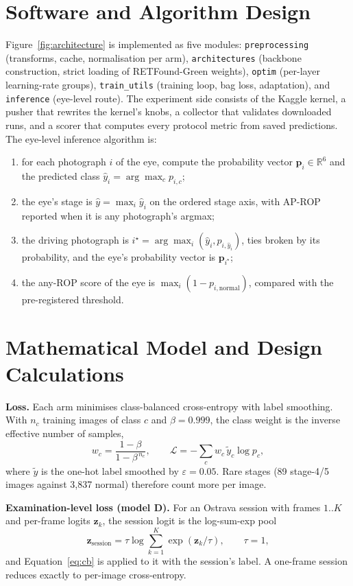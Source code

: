 \section{Software and Algorithm Design}
Figure~\ref{fig:architecture} is implemented as five modules: \texttt{preprocessing} (transforms, cache, normalisation per arm), \texttt{architectures} (backbone construction, strict loading of RETFound-Green weights), \texttt{optim} (per-layer learning-rate groups), \texttt{train\_utils} (training loop, bag loss, adaptation), and \texttt{inference} (eye-level route). The experiment side consists of the Kaggle kernel, a pusher that rewrites the kernel's knobs, a collector that validates downloaded runs, and a scorer that computes every protocol metric from saved predictions. The eye-level inference algorithm is:
\begin{enumerate}
\item for each photograph $i$ of the eye, compute the probability vector $\mathbf{p}_i\in\mathbb{R}^6$ and the predicted class $\hat{y}_i=\arg\max_c p_{i,c}$;
\item the eye's stage is $\hat{y}=\max_i \hat{y}_i$ on the ordered stage axis, with AP-ROP reported when it is any photograph's argmax;
\item the driving photograph is $i^\star=\arg\max_i(\hat{y}_i, p_{i,\hat{y}_i})$, ties broken by its probability, and the eye's probability vector is $\mathbf{p}_{i^\star}$;
\item the any-ROP score of the eye is $\max_i(1-p_{i,\text{normal}})$, compared with the pre-registered threshold.
\end{enumerate}

\section{Mathematical Model and Design Calculations}
\textbf{Loss.} Each arm minimises class-balanced cross-entropy with label smoothing. With $n_c$ training images of class $c$ and $\beta=0.999$, the class weight is the inverse effective number of samples,
\begin{equation}\label{eq:cb}
w_c=\frac{1-\beta}{1-\beta^{\,n_c}},\qquad
\mathcal{L}=-\sum_{c}w_c\,\tilde{y}_c\log p_c,
\end{equation}
where $\tilde{y}$ is the one-hot label smoothed by $\varepsilon=0.05$. Rare stages (89 stage-4/5 images against 3{,}837 normal) therefore count more per image.

\textbf{Examination-level loss (model D).} For an Ostrava session with frames $1..K$ and per-frame logits $\mathbf{z}_k$, the session logit is the log-sum-exp pool
\begin{equation}\label{eq:lse}
\mathbf{z}_{\text{session}}=\tau\log\sum_{k=1}^{K}\exp(\mathbf{z}_k/\tau),\qquad \tau=1,
\end{equation}
and Equation~\ref{eq:cb} is applied to it with the session's label. A one-frame session reduces exactly to per-image cross-entropy.

